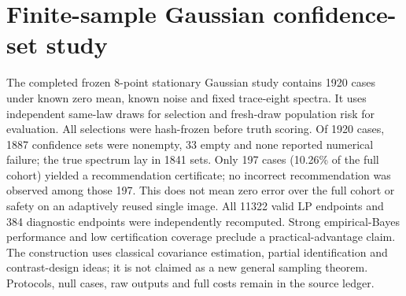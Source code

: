 \section{Finite-sample Gaussian confidence-set study}\label{app:confidence}
The completed frozen 8-point stationary Gaussian study contains 1920 cases under known zero mean, known noise and fixed trace-eight spectra. It uses independent same-law draws for selection and fresh-draw population risk for evaluation. All selections were hash-frozen before truth scoring. Of 1920 cases, 1887 confidence sets were nonempty, 33 empty and none reported numerical failure; the true spectrum lay in 1841 sets. Only 197 cases (10.26\% of the full cohort) yielded a recommendation certificate; no incorrect recommendation was observed among those 197. This does not mean zero error over the full cohort or safety on an adaptively reused single image. All 11322 valid LP endpoints and 384 diagnostic endpoints were independently recomputed. Strong empirical-Bayes performance and low certification coverage preclude a practical-advantage claim. The construction uses classical covariance estimation, partial identification and contrast-design ideas; it is not claimed as a new general sampling theorem. Protocols, null cases, raw outputs and full costs remain in the source ledger.
